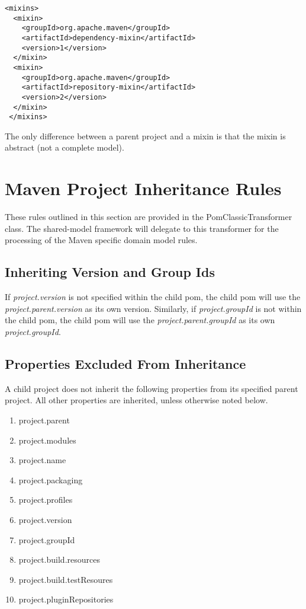 \documentclass[12pt]{amsart}
\begin{document}
\begin{verbatim}
<mixins>
  <mixin>
    <groupId>org.apache.maven</groupId>
    <artifactId>dependency-mixin</artifactId>
    <version>1</version>
  </mixin>
  <mixin>
    <groupId>org.apache.maven</groupId>
    <artifactId>repository-mixin</artifactId>
    <version>2</version>
  </mixin>
 </mixins>
\end{verbatim}

The only difference between a parent project and a mixin is that the mixin is abstract (not a complete model).

\section{Maven Project Inheritance Rules}
These rules outlined in this section are provided in the PomClassicTransformer class. The shared-model framework will delegate to this transformer for the processing of the Maven specific domain model rules.

\subsection{Inheriting Version and Group Ids}
If \emph{project.version} is not specified within the child pom, the child pom will use the \emph{project.parent.version} as its own version. Similarly, if \emph{project.groupId} is not within the child pom, the child pom will use the \emph{project.parent.groupId} as its own \emph{project.groupId}.

\subsection{Properties Excluded From Inheritance}
A child project does not inherit the following properties from its specified parent project. All other properties are inherited, unless otherwise noted below.
\begin{enumerate}
\item project.parent
\item project.modules
\item project.name
\item project.packaging
\item project.profiles
\item project.version
\item project.groupId
\item project.build.resources
\item project.build.testResoures
\item project.pluginRepositories
\end{enumerate}
\end{document}
